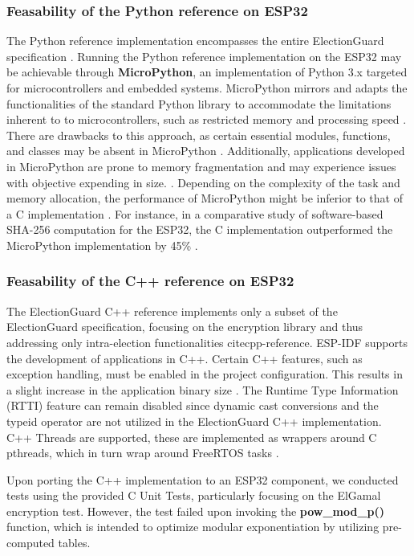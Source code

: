 \subsubsection{Feasability of the Python reference on ESP32}
The Python reference implementation encompasses the entire ElectionGuard specification \cite{python-reference}. Running the Python reference implementation on the ESP32 may be achievable through \textbf{MicroPython}, an implementation of Python 3.x targeted for microcontrollers and embedded systems. MicroPython mirrors and adapts the functionalities of the standard Python library to accommodate the limitations inherent to to microcontrollers, such as restricted memory and processing speed \cite{micropython} \cite[234]{micropython-performance}. There are drawbacks to this approach, as certain essential modules, functions, and classes may be absent in MicroPython \cite{micropython}. Additionally, applications developed in MicroPython are prone to memory fragmentation and may experience issues with objective expending in size. \cite[234]{micropython-performance}. Depending on the complexity of the task and memory allocation, the performance of MicroPython might be inferior to that of a C implementation \cite[237]{micropython-performance}. For instance, in a comparative study of software-based SHA-256 computation for the ESP32, the C implementation outperformed the MicroPython implementation by 45\% \cite[237]{micropython-performance}.

\subsubsection{Feasability of the C++ reference on ESP32}
The ElectionGuard C++ reference implements only a subset of the ElectionGuard specification, focusing on the encryption library and thus addressing only intra-election functionalities cite{cpp-reference}. ESP-IDF supports the development of applications in C++. Certain C++ features, such as exception handling, must be enabled in the project configuration. This results in a slight increase in the application binary size \cite{esp-prog}. The Runtime Type Information (RTTI) feature can remain disabled since dynamic cast conversions and the typeid operator are not utilized in the ElectionGuard C++ implementation. C++ Threads are supported, these are implemented as wrappers around C pthreads, which in turn wrap around FreeRTOS tasks \cite{esp-prog}.

Upon porting the C++ implementation to an ESP32 component, we conducted tests using the provided C Unit Tests, particularly focusing on the ElGamal encryption test. However, the test failed upon invoking the \textbf{pow\_mod\_p()} function, which is intended to optimize modular exponentiation by utilizing pre-computed tables.

